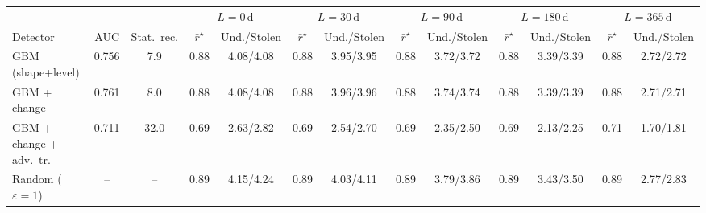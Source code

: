 \begin{tabular}{lcccccccccccc}
\toprule
 & & & \multicolumn{2}{c}{$L{=}0$\,d} & \multicolumn{2}{c}{$L{=}30$\,d} & \multicolumn{2}{c}{$L{=}90$\,d} & \multicolumn{2}{c}{$L{=}180$\,d} & \multicolumn{2}{c}{$L{=}365$\,d} \\
\cmidrule(lr){4-5}\cmidrule(lr){6-7}\cmidrule(lr){8-9}\cmidrule(lr){10-11}\cmidrule(lr){12-13}
Detector & AUC & Stat.\ rec. & $\bar r^\star$ & Und./Stolen & $\bar r^\star$ & Und./Stolen & $\bar r^\star$ & Und./Stolen & $\bar r^\star$ & Und./Stolen & $\bar r^\star$ & Und./Stolen \\
\midrule
GBM (shape+level) & 0.756 & 7.9 & 0.88 & 4.08/4.08 & 0.88 & 3.95/3.95 & 0.88 & 3.72/3.72 & 0.88 & 3.39/3.39 & 0.88 & 2.72/2.72 \\
GBM + change & 0.761 & 8.0 & 0.88 & 4.08/4.08 & 0.88 & 3.96/3.96 & 0.88 & 3.74/3.74 & 0.88 & 3.39/3.39 & 0.88 & 2.71/2.71 \\
GBM + change + adv.\ tr. & 0.711 & 32.0 & 0.69 & 2.63/2.82 & 0.69 & 2.54/2.70 & 0.69 & 2.35/2.50 & 0.69 & 2.13/2.25 & 0.71 & 1.70/1.81 \\
\midrule
Random ($\varepsilon{=}1$) & -- & -- & 0.89 & 4.15/4.24 & 0.89 & 4.03/4.11 & 0.89 & 3.79/3.86 & 0.89 & 3.43/3.50 & 0.89 & 2.77/2.83 \\
\bottomrule
\end{tabular}
